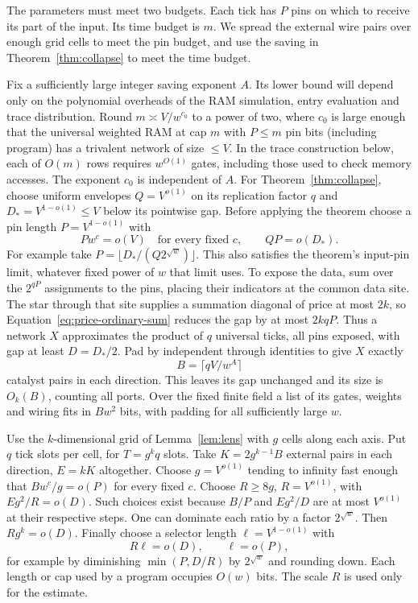 The parameters must meet two budgets. Each tick has $P$ pins on
which to receive its part of the input. Its time budget is $m$.
We spread the external wire pairs over enough grid cells to meet the pin
budget, and use the saving in Theorem~\ref{thm:collapse} to meet the
time budget.

Fix a sufficiently large integer saving exponent $A$. Its lower bound
will depend only on the polynomial overheads of the RAM simulation,
entry evaluation and trace distribution. Round $m\asymp V/w^{c_0}$ to a power of
two, where $c_0$ is large enough that the universal weighted RAM at cap
$m$ with $P\le m$ pin bits (including program) has a trivalent network
of size $\le V$. In the trace construction below, each of $O(m)$ rows
requires $w^{O(1)}$ gates, including those used to check memory accesses. The exponent $c_0$ is independent of $A$. For
Theorem~\ref{thm:collapse}, choose uniform envelopes $Q=V^{o(1)}$
on its replication factor $q$ and $D_*=V^{1-o(1)}\le V$ below its
pointwise gap. Before applying the theorem choose a pin length
$P=V^{1-o(1)}$ with
\[
         P w^c=o(V)\quad\text{for every fixed }c,\qquad
         QP=o(D_*).
\]
For example take $P=\lfloor D_*/(Q2^{\sqrt w})\rfloor$. This also
satisfies the theorem's input-pin limit, whatever fixed power of $w$
that limit uses. To expose the data, sum over the $2^{qP}$
assignments to the pins, placing their indicators at the common data
site. The star through that site supplies a summation diagonal of price
at most $2k$, so Equation~\eqref{eq:price-ordinary-sum} reduces the gap
by at most $2kqP$.
Thus a network $X$ approximates the product of $q$ universal ticks,
all pins exposed, with gap at least $D=D_*/2$. Pad by independent through
identities to give $X$ exactly
\[
                        B=\lceil qV/w^A\rceil
\]
catalyst pairs in each direction. This leaves its gap unchanged and
its size is $O_k(B)$, counting all ports. Over the fixed finite field
a list of its gates, weights and wiring fits in $B w^2$ bits, with
padding for all sufficiently large $w$.

Use the $k$-dimensional grid of Lemma~\ref{lem:lens} with $g$ cells
along each axis. Put $q$ tick slots per cell, for $T=g^kq$ slots.
Take $K=2g^{k-1}B$ external pairs in each direction, $E=kK$ altogether.
Choose $g=V^{o(1)}$ tending to infinity fast enough that
$Bw^c/g=o(P)$ for every fixed $c$. Choose $R\ge8g$, $R=V^{o(1)}$,
with $Eg^2/R=o(D)$. Such choices exist because $B/P$ and $Eg^2/D$
are at most $V^{o(1)}$ at their respective steps. One can dominate
each ratio by a factor $2^{\sqrt w}$. Then $Rg^k=o(D)$. Finally
choose a selector length $\ell=V^{1-o(1)}$ with
\[
                    R\ell=o(D),\qquad \ell=o(P),
\]
for example by diminishing $\min(P,D/R)$ by $2^{\sqrt w}$ and
rounding down. Each length or cap used by a program occupies $O(w)$
bits. The scale $R$ is used only for the estimate.

